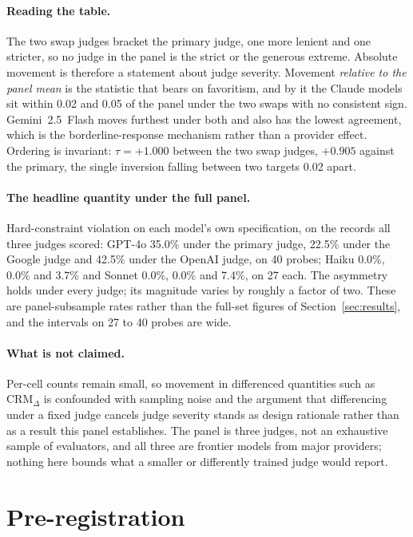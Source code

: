\documentclass{article}
\begin{document}
\paragraph{Reading the table.}
The two swap judges bracket the primary judge, one more lenient and one stricter, so no judge in
the panel is the strict or the generous extreme. Absolute movement is therefore a statement about
judge severity. Movement \emph{relative to the panel mean} is the statistic that bears on
favoritism, and by it the Claude models sit within 0.02 and 0.05 of the panel under the two swaps
with no consistent sign. Gemini~2.5~Flash moves furthest under both and also has the lowest
agreement, which is the borderline-response mechanism rather than a provider effect. Ordering is
invariant: $\tau = +1.000$ between the two swap judges, $+0.905$ against the primary, the single
inversion falling between two targets 0.02 apart.

\paragraph{The headline quantity under the full panel.}
Hard-constraint violation on each model's own specification, on the records all three judges
scored: GPT-4o 35.0\% under the primary judge, 22.5\% under the Google judge and 42.5\% under
the OpenAI judge, on 40 probes; Haiku 0.0\%, 0.0\% and 3.7\% and Sonnet 0.0\%, 0.0\% and 7.4\%,
on 27 each. The asymmetry holds under every judge; its magnitude varies by roughly a factor of
two. These are panel-subsample rates rather than the full-set figures of
Section~\ref{sec:results}, and the intervals on 27 to 40 probes are wide.

\paragraph{What is not claimed.}
Per-cell counts remain small, so movement in differenced quantities such as
$\text{CRM}_\Delta$ is confounded with sampling noise and the argument that differencing under
a fixed judge cancels judge severity stands as design rationale rather than as a result this
panel establishes. The panel is three judges, not an exhaustive sample of evaluators, and all
three are frontier models from major providers; nothing here bounds what a smaller or
differently trained judge would report.

\section{Pre-registration}
\label{app:prereg}
\end{document}

